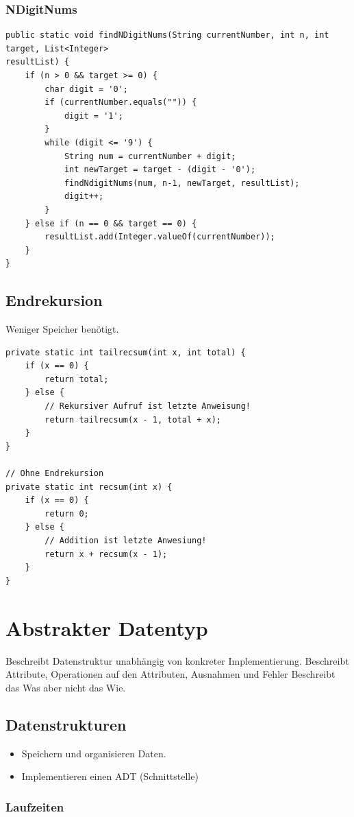 \begin{multicols*}{4}
 	\subsubsection{NDigitNums}
		\begin{lstlisting}
public static void findNDigitNums(String currentNumber, int n, int target, List<Integer>
resultList) {
	if (n > 0 && target >= 0) {
		char digit = '0';
		if (currentNumber.equals("")) {
			digit = '1';
		}
		while (digit <= '9') {
			String num = currentNumber + digit;
			int newTarget = target - (digit - '0');
			findNdigitNums(num, n-1, newTarget, resultList);
			digit++;
		}
	} else if (n == 0 && target == 0) {
		resultList.add(Integer.valueOf(currentNumber));
	}
}
		\end{lstlisting}

	\subsection{Endrekursion}
	Weniger Speicher benötigt.
		\begin{lstlisting}
private static int tailrecsum(int x, int total) {
	if (x == 0) {
		return total;
	} else {
		// Rekursiver Aufruf ist letzte Anweisung!
		return tailrecsum(x - 1, total + x);
	}
}

// Ohne Endrekursion
private static int recsum(int x) {
	if (x == 0) {
		return 0;
	} else {
		// Addition ist letzte Anwesiung!
		return x + recsum(x - 1);
	}
}
		\end{lstlisting}

\section{Abstrakter Datentyp}
Beschreibt Datenstruktur unabhängig von konkreter Implementierung.
Beschreibt Attribute, Operationen auf den Attributen, Ausnahmen und Fehler
Beschreibt das Was aber nicht das Wie.

	\subsection{Datenstrukturen}
		\begin{itemize}
			\item Speichern und organisieren Daten.
			\item Implementieren einen ADT (Schnittstelle)
		\end{itemize}
	
		\subsubsection{Laufzeiten}
	

\end{multicols*}
